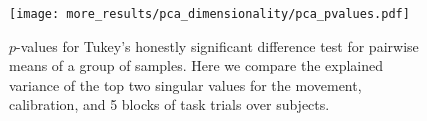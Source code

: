 \documentclass[../main.tex]{subfiles}
\begin{document}


\begin{figure}[tph]
  \centering
  \texttt{[image: more\_results/pca\_dimensionality/pca\_pvalues.pdf]}
  \caption[Explained variance Tukey test]{$p$-values for Tukey's honestly significant difference test for pairwise means of a group of samples. Here we compare the explained variance of the top two singular values for the movement, calibration, and 5 blocks of task trials over subjects.}\label{fig:pca_pvalues}
\end{figure}





\end{document}
